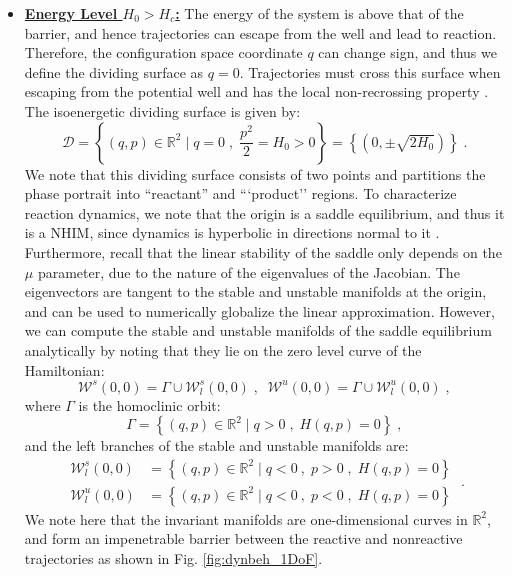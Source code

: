 \documentclass[8pt]{article}
\begin{document}
\begin{itemize}
	\item \underline{\textbf{Energy Level $H_0 > H_c$:}} The energy of the system is above that of the barrier, and hence trajectories can escape from the well and lead to reaction. Therefore, the configuration space coordinate $q$ can change sign, and thus we define the dividing surface as $q = 0$. Trajectories must cross this surface   when escaping from the potential well and has the local non-recrossing property \cite{wiggins2016}. The isoenergetic dividing surface is given by: 
	\begin{equation}
	\mathcal{D} = \left\lbrace (q, p) \in \mathbb{R}^2 \; | \; q = 0 \;,\; \frac{p^2}{2}  = H_0 > 0  \right\rbrace = \left\lbrace \left(0, \pm \sqrt{2H_0}\right) \right\rbrace \;. \label{eq:snham_1dof_ds}
	\end{equation}
	We note that this dividing surface consists of two points and partitions the phase portrait into ``reactant'' and ```product'' regions. To characterize reaction dynamics, we note that the origin is a saddle equilibrium, and thus it is a NHIM, since dynamics is hyperbolic in directions normal to it \cite{wig2016}. Furthermore, recall that the linear stability of the saddle only depends on the $\mu$ parameter, due to the nature of the eigenvalues of the Jacobian. The eigenvectors are tangent to the stable and unstable manifolds at the origin, and can be used to numerically globalize the linear approximation. However, we can compute the stable and unstable manifolds of the saddle equilibrium analytically by noting that they lie on the zero level curve of the Hamiltonian:
	\begin{equation}
	\mathcal{W}^s(0,0) = \Gamma \cup \mathcal{W}^s_l(0,0) \;,\; \; \mathcal{W}^u(0,0) = \Gamma \cup \mathcal{W}^u_l(0,0) \;,
	\end{equation}
	where $\Gamma$ is the homoclinic orbit:
	\begin{equation}
	\Gamma = \left\lbrace  (q,p) \in \mathbb{R}^2 \; | \; q > 0 \;,\; H(q,p) = 0  \right\rbrace \;,
	\end{equation}
	and the left branches of the stable and unstable manifolds are:
	\begin{equation}
	\begin{split}
	\mathcal{W}^s_l(0,0) &= \left\lbrace  (q,p) \in \mathbb{R}^2 \; | \; q < 0 \:,\; p > 0 \;,\; H(q,p) = 0 \right\rbrace \\
	\mathcal{W}^u_l(0,0) &= \left\lbrace  (q,p) \in \mathbb{R}^2 \; | \; q < 0 \:,\; p < 0 \;,\; H(q,p) = 0 \right\rbrace
	\end{split} \;.
	\end{equation}
	We note here that the invariant manifolds are one-dimensional curves in $\mathbb{R}^2$, and form an impenetrable barrier between the reactive and nonreactive trajectories as shown in Fig. \ref{fig:dynbeh_1DoF}.
\end{itemize}
\end{document}
